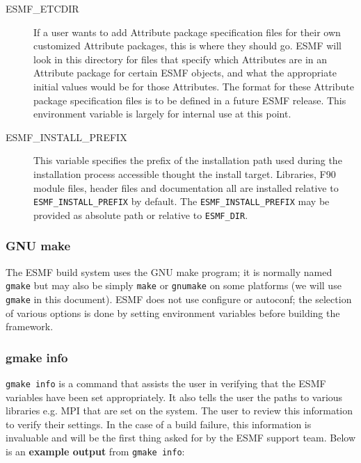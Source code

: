 \begin{description}
\item[ESMF\_ETCDIR]
If a user wants to add Attribute package specification files for their own 
customized Attribute packages, this is where they should go.  ESMF will look in 
this directory for files that specify which Attributes are in an Attribute 
package for certain ESMF objects, and what the appropriate initial values would 
be for those Attributes.  The format for these Attribute package specification 
files is to be defined in a future ESMF release.  This environment variable is 
largely for internal use at this point. 

\item[ESMF\_INSTALL\_PREFIX]
This variable specifies the prefix of the installation path used during the
installation process accessible thought the install target. Libraries, F90
module files, header files and documentation all are installed relative to
{\tt ESMF\_INSTALL\_PREFIX} by default. The {\tt ESMF\_INSTALL\_PREFIX} may be
provided as absolute path or relative to {\tt ESMF\_DIR}.

\end{description}


\subsubsection{GNU make}
The ESMF build system uses the GNU make program; it is normally named 
{\tt gmake} but may also be simply {\tt make} or {\tt gnumake} on some 
platforms (we will use {\tt gmake} in this document). ESMF does not use
configure or autoconf;  the selection of various options is done by
setting environment variables before building the framework. 


\subsubsection{gmake info}
{\tt gmake info} is a command that assists the user in verifying that the ESMF 
variables have been set appropriately. It also tells the user the paths to 
various libraries e.g. MPI that are set on the system. The user to review 
this information to verify their settings. In the case of a build failure, 
this information is invaluable and will be the first thing asked for by the
ESMF support team. Below is an {\bf example output} from {\tt gmake info}: 
 
